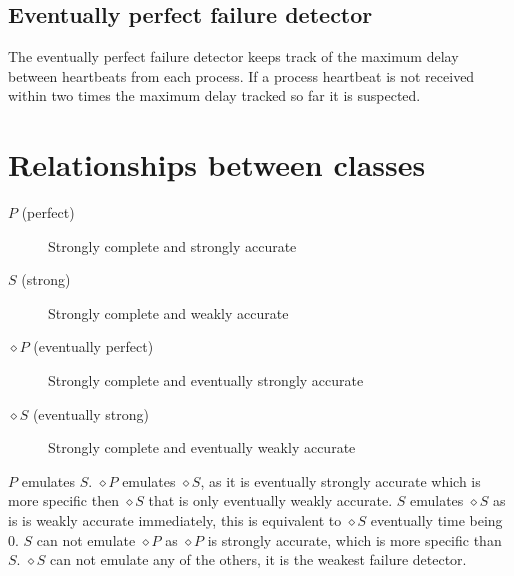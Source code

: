 \documentclass[11pt]{amsart}
\begin{document}
\subsection{Eventually perfect failure detector}

The eventually perfect failure detector keeps track of the maximum delay
between heartbeats from each process. If a process heartbeat is not received
within two times the maximum delay tracked so far it is suspected.

\section{Relationships between classes}

\begin{description}
	\item[$P$ (perfect)] Strongly complete and strongly accurate
	\item[$S$ (strong)] Strongly complete and weakly accurate
	\item[$\diamond P$ (eventually perfect)] Strongly complete and eventually strongly accurate
	\item[$\diamond S$ (eventually strong)] Strongly complete and eventually weakly accurate
\end{description}

$P$ emulates $S$. 
$\diamond P$ emulates $\diamond S$, as it is eventually strongly accurate which
is more specific then $\diamond S$ that is only eventually weakly accurate.
$S$ emulates $\diamond S$ as is is weakly accurate immediately, this is equivalent to $\diamond S$ eventually time being 0.
$S$ can not emulate $\diamond P$ as $\diamond P$ is strongly accurate, which is more specific than $S$.
$\diamond S$ can not emulate any of the others, it is the weakest failure detector.
\end{document}
